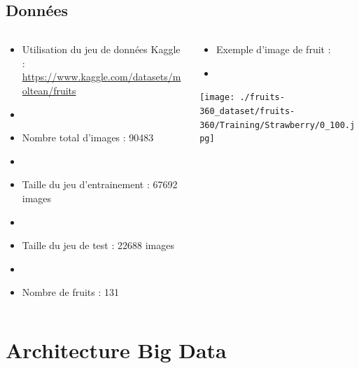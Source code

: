 \documentclass[8pt,aspectratio=169,hyperref={unicode=true}]{beamer}
\begin{document}
\subsection{Données}
\begin{frame}{\insertsubsection}
  \begin{columns}
    \begin{column}{.6\textwidth}
      \begin{itemize}
        \item Utilisation du jeu de données Kaggle : \url{https://www.kaggle.com/datasets/moltean/fruits}
        \item[]
        \item Nombre total d'images : 90483
        \item[]
        \item Taille du jeu d'entrainement : 67692 images
        \item[]
        \item Taille du jeu de test : 22688 images
        \item[]
        \item  Nombre de fruits : 131
      \end{itemize}
    \end{column}
    \begin{column}{.4\textwidth}
      \begin{itemize}
        \item Exemple d'image de fruit :
        \item[]
      \end{itemize}
      \texttt{[image: ./fruits-360\_dataset/fruits-360/Training/Strawberry/0\_100.jpg]}
    \end{column}
  \end{columns}
\end{frame}

\section{Architecture Big Data}
\end{document}
